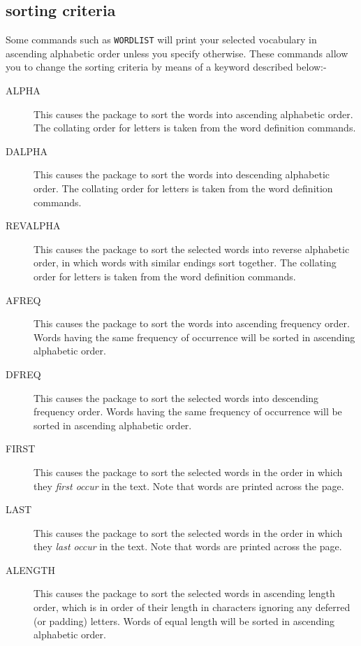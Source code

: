 \subsection{sorting criteria}
\label{sorting}
Some commands such as \verb/WORDLIST/ will print your selected
vocabulary in ascending alphabetic order unless you specify otherwise.
These commands allow you to change the sorting criteria by means of
a keyword described below:-
\begin{description}
\item[ALPHA]
This causes the package to sort the words into ascending alphabetic
order.  The collating order for letters is taken from the word
definition commands.

\item[DALPHA]
This causes the package to sort the words into descending alphabetic
order.  The collating order for letters is taken from the word
definition commands.

\item[REVALPHA]
This causes the package to sort the selected words into reverse
alphabetic order, in which words with similar endings sort together. The
collating order for letters is taken from the word definition commands.

\item[AFREQ]
This causes the package to sort the words into ascending frequency
order. Words having the same frequency of occurrence will be sorted
in ascending alphabetic order.

\item[DFREQ]
This causes the package to sort the selected words into descending
frequency order.  Words having the same frequency of occurrence will be
sorted in ascending alphabetic order.

\item[FIRST]
This causes the package to sort the selected words in the order in
which they {\em first occur} in the text.  Note that words are printed
across the page.

\item[LAST]
This causes the package to sort the selected words in the order in
which they {\em last occur} in the text.  Note that words are printed
across the page.

\item[ALENGTH]
This causes the package to sort the selected words in ascending
length order, which is in order of their length in characters
ignoring any deferred (or padding) letters. Words of equal length
will be sorted in ascending alphabetic order.


\end{description}
